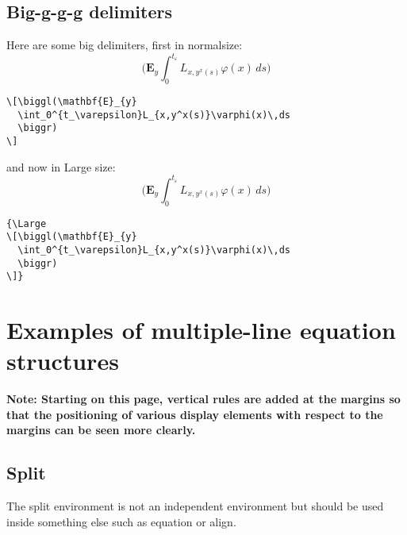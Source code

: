 \documentclass[draft]{amsart}
\newcommand{\ntt}{\normalfont\ttfamily}
\newcommand{\cn}[1]{{\protect\ntt\bslash#1}}
\newcommand{\env}[1]{{\protect\ntt#1}}
\theoremstyle{definition}
\theoremstyle{remark}
\begin{document}
\subsection{Big-g-g-g delimiters}
Here are some big delimiters, first in \cn{normalsize}:
\[\biggl(\mathbf{E}_{y}
  \int_0^{t_\varepsilon}L_{x,y^x(s)}\varphi(x)\,ds
  \biggr)
\]
\begin{verbatim}
\[\biggl(\mathbf{E}_{y}
  \int_0^{t_\varepsilon}L_{x,y^x(s)}\varphi(x)\,ds
  \biggr)
\]
\end{verbatim}
and now in \cn{Large} size:
{\Large
\[\biggl(\mathbf{E}_{y}
  \int_0^{t_\varepsilon}L_{x,y^x(s)}\varphi(x)\,ds
  \biggr)
\]}
\begin{verbatim}
{\Large
\[\biggl(\mathbf{E}_{y}
  \int_0^{t_\varepsilon}L_{x,y^x(s)}\varphi(x)\,ds
  \biggr)
\]}
\end{verbatim}

\newpage
\makeatletter

\def\@makecol{\ifvoid\footins \setbox\@outputbox\box\@cclv
   \else\setbox\@outputbox
     \vbox{\boxmaxdepth \maxdepth
     \unvbox\@cclv\vskip\skip\footins\footnoterule\unvbox\footins}\fi
  \xdef\@freelist{\@freelist\@midlist}\gdef\@midlist{}\@combinefloats
  \setbox\@outputbox\hbox{\vrule width\marginrulewidth
        \vbox to\@colht{\boxmaxdepth\maxdepth
         \@texttop\dimen128=\dp\@outputbox\unvbox\@outputbox
         \vskip-\dimen128\@textbottom}%
        \vrule width\marginrulewidth}%
     \global\maxdepth\@maxdepth}
\newdimen\marginrulewidth
\setlength{\marginrulewidth}{.1pt}
\makeatother


\appendix
\section{Examples of multiple-line equation structures}
\label{s:eq}

\textbf{\large Note: Starting on this page, vertical rules are
added at the margins so that the positioning of various display elements
with respect to the margins can be seen more clearly.}

\subsection{Split}
The \env{split} environment is not an independent environment
but should be used inside something else such as \env{equation}
or \env{align}.
\end{document}
